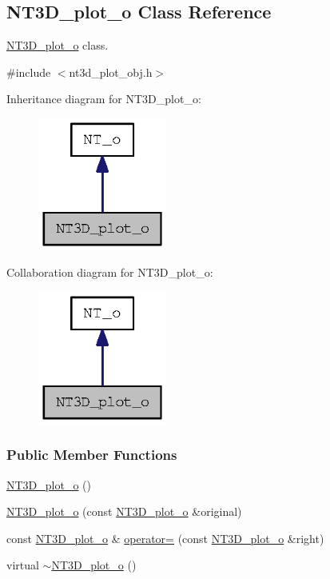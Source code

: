 \subsection{NT3D\_\-plot\_\-o Class Reference}
\label{class_n_t3_d__plot__o}


\hyperlink{class_n_t3_d__plot__o}{NT3D\_\-plot\_\-o} class.  




{\ttfamily \#include $<$nt3d\_\-plot\_\-obj.h$>$}



Inheritance diagram for NT3D\_\-plot\_\-o:
\nopagebreak
\begin{figure}[H]
\begin{center}
\leavevmode
\includegraphics[width=120pt]{class_n_t3_d__plot__o__inherit__graph}
\end{center}
\end{figure}


Collaboration diagram for NT3D\_\-plot\_\-o:
\nopagebreak
\begin{figure}[H]
\begin{center}
\leavevmode
\includegraphics[width=120pt]{class_n_t3_d__plot__o__coll__graph}
\end{center}
\end{figure}
\subsubsection*{Public Member Functions}
\begin{DoxyCompactItemize}
\item 
\hyperlink{class_n_t3_d__plot__o_a1c1a489979083286582bc611625cb404}{NT3D\_\-plot\_\-o} ()
\item 
\hyperlink{class_n_t3_d__plot__o_a453ef9f4966bc874e4dd3d5f62611a27}{NT3D\_\-plot\_\-o} (const \hyperlink{class_n_t3_d__plot__o}{NT3D\_\-plot\_\-o} \&original)
\item 
const \hyperlink{class_n_t3_d__plot__o}{NT3D\_\-plot\_\-o} \& \hyperlink{class_n_t3_d__plot__o_ada44b7b8e7d02935d662d73166cc9772}{operator=} (const \hyperlink{class_n_t3_d__plot__o}{NT3D\_\-plot\_\-o} \&right)
\item 
virtual \hyperlink{class_n_t3_d__plot__o_a37a12e9f7bab52993856bb20e57250d9}{$\sim$NT3D\_\-plot\_\-o} ()
\end{DoxyCompactItemize}


